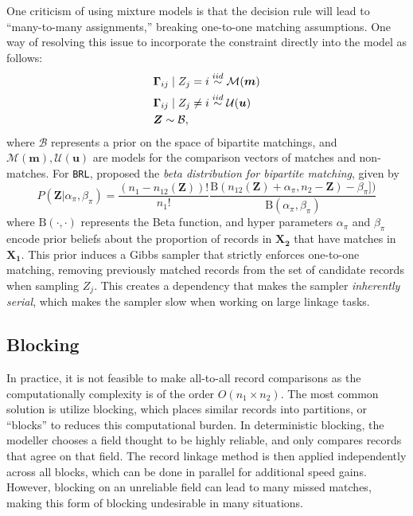 \documentclass[12pt,letterpaper]{article}
\newcommand{\1}[1]{\mathbb{I}\!\left[#1\right]} %
\begin{document}
One criticism of using mixture models is that the decision rule will lead to ``many-to-many assignments,'' breaking one-to-one matching assumptions. One way of resolving this issue to incorporate the constraint directly into the model as follows:
\begin{align}
	&\bm{\Gamma}_{ij} \mid Z_j =i \stackrel{iid}{\sim} \mathcal{M}(\bm{m})  \\
	&\bm{\Gamma}_{ij} \mid Z_j \neq i \stackrel{iid}{\sim} \mathcal{U}(\bm{u}) \notag \\
	& \bm{Z} \sim \mathcal{B}, \notag
\end{align}
where $\mathcal{B}$ represents a prior on the space of bipartite matchings, and $\mathcal{M}(\bm{m}), \mathcal{U}(\bm{u})$ are models for the comparison vectors of matches and non-matches. For \texttt{BRL}, \cite{sadinle_bayesian_2017} proposed the \emph{beta distribution for bipartite matching}, given by
$$P(\mathbf{Z}|\alpha_{\pi}, \beta_{\pi}) = \frac{(n_1 - n_{12}(\mathbf{Z}))!}{n_1 !}\frac{\text{B}(n_{12}(\mathbf{Z}) + \alpha_{\pi}, n_2 - \mathbf{Z}) - \beta_{\pi}])}{\text{B}(\alpha_{\pi}, \beta_{\pi})}
$$
where $\text{B}(\cdot, \cdot)$ represents the Beta function, and hyper parameters $\alpha_{\pi}$ and $\beta_{\pi}$ encode prior beliefs about the proportion of records in $\bm{X_2}$ that have matches in $\bm{X_1}$. This prior induces a Gibbs sampler that strictly enforces one-to-one matching, removing previously matched records from the set of candidate
records when sampling \(Z_j\). This creates a dependency that makes the
sampler \emph{inherently serial}, which makes the sampler slow when working on large linkage tasks. 

\subsection{Blocking}

In practice, it is not feasible to make all-to-all record comparisons as the computationally complexity is of the order $O(n_1 \times n_2).$ The most common solution is utilize blocking, which places similar records into partitions, or ``blocks'' to reduces this computational burden. In deterministic blocking, the modeller chooses a field thought to be highly reliable, and only compares records that agree on that field. The record linkage method is then applied independently across all blocks, which can be done in parallel for additional speed gains. However, blocking on an unreliable field can lead to many missed matches, making this form of blocking undesirable in many situations.
\end{document}
